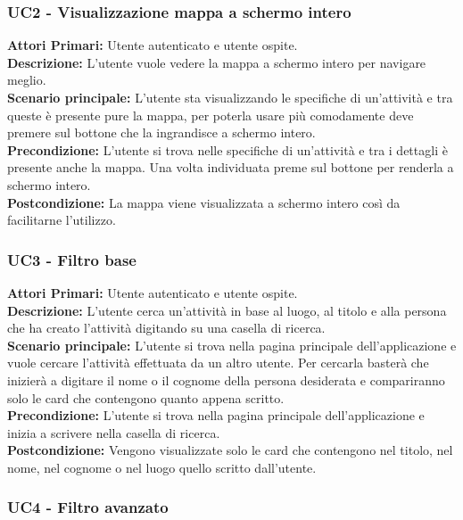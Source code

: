 \subsubsection{ UC2 - Visualizzazione mappa a schermo intero}

\textbf{Attori Primari:} Utente autenticato e utente ospite.\\
\textbf{Descrizione:} L'utente vuole vedere la mappa a schermo intero per navigare meglio.\\
\textbf{Scenario principale:} L'utente sta visualizzando le specifiche di un'attività e tra queste è presente pure la mappa, per poterla usare più comodamente deve premere sul bottone che la ingrandisce a schermo intero.\\
\textbf{Precondizione:} L'utente si trova nelle specifiche di un'attività e tra i dettagli è presente anche la mappa. Una volta individuata preme sul bottone per renderla a schermo intero.\\
\textbf{Postcondizione:} La mappa viene visualizzata a schermo intero così da facilitarne l'utilizzo.\\

\subsubsection{ UC3 - Filtro base}

\textbf{Attori Primari:} Utente autenticato e utente ospite.\\
\textbf{Descrizione:} L'utente cerca un'attività in base al luogo, al titolo e alla persona che ha creato l'attività digitando su una casella di ricerca.\\
\textbf{Scenario principale:} L'utente si trova nella pagina principale dell'applicazione e vuole cercare l'attività effettuata da un altro utente. Per cercarla basterà che inizierà a digitare il nome o il cognome della persona desiderata e compariranno solo le card che contengono quanto appena scritto.\\
\textbf{Precondizione:} L'utente si trova nella pagina principale dell'applicazione e inizia a scrivere nella casella di ricerca.\\
\textbf{Postcondizione:} Vengono visualizzate solo le card che contengono nel titolo, nel nome, nel cognome o nel luogo quello scritto dall'utente.\\

\subsubsection{ UC4 - Filtro avanzato}

